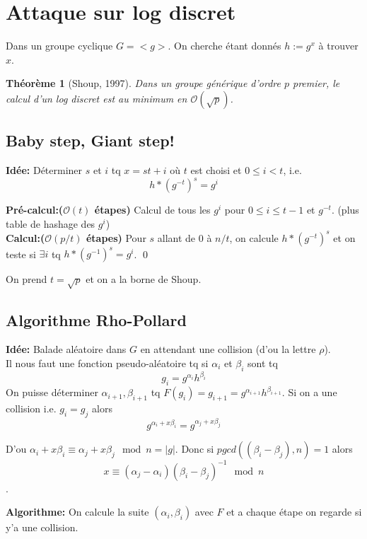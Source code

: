 \documentclass[12pt]{article}
\theoremstyle{plain}
\newtheorem{thm}[subsubsection]{Th\'eor\`eme}
\theoremstyle{definition}
\newcommand{\Or}{\mathcal{O}}
\begin{document}
\newpage
\section{Attaque sur log discret}

Dans un groupe cyclique $G=<g>$. On cherche 
étant donnés $h:=g^x$ à trouver $x$.

\begin{thm}[Shoup, 1997]
    Dans un groupe générique d'ordre \(p\) premier, 
    le calcul d'un log discret est au minimum en 
    $\Or(\sqrt{p})$.
\end{thm}

\subsection{Baby step, Giant step!}
\textbf{Idée:} Déterminer $s$ et $i$ tq $x=st+i$ où $t$
est choisi et $0\leq i<t$, i.e. \[h*(g^{-t})^s=g^i\]

\textbf{Pré-calcul:($\Or(t)$ étapes)} Calcul de tous les
 $g^i$ pour $0\leq i\leq t-1$ et $g^{-t}$.  (plus table
  de hashage des $g^i$)\\

\textbf{Calcul:($\Or(p/t)$ étapes)} Pour $s$ allant de
$0$ à $n/t$, on calcule $h*(g^{-t})^s$ et on teste
si $\exists i$ tq $h*(g^{-1})^s=g^i$. \qed
\newline

On prend $t=\sqrt{p}$ et on a la borne de Shoup.\\

\subsection{Algorithme Rho-Pollard}
\textbf{Idée: }Balade aléatoire dans $G$ en attendant
 une collision (d'ou la lettre $\rho$).\\

Il nous faut une fonction pseudo-aléatoire tq si 
$\alpha_i$ et $\beta_i$ sont tq 
    \[g_i=g^{\alpha_i} h^{\beta_i}\]
On puisse déterminer $\alpha_{i+1},\beta_{i+1}$ tq 
$F(g_i)=g_{i+1}=g^{\alpha_{i+1}}h^{\beta_{i+1}}$. 
Si on a une collision i.e. $g_i=g_j$ alors 
    \[g^{\alpha_i+x\beta_i}=g^{\alpha_j+x\beta_j}\]

\noindent D'ou $\alpha_i+x\beta_i\equiv \alpha_j+x\beta_j \mod n=
\lvert g\rvert$. Donc si $pgcd((\beta_i-\beta_j),n)=1$
alors \[x\equiv (\alpha_j-\alpha_i)(\beta_i-\beta_j)^{-1}
\mod n\].

\noindent \textbf{Algorithme:} On calcule la suite 
$(\alpha_i,\beta_i)$ avec $F$ et a chaque étape 
on regarde si y'a une collision.\\
\end{document}
